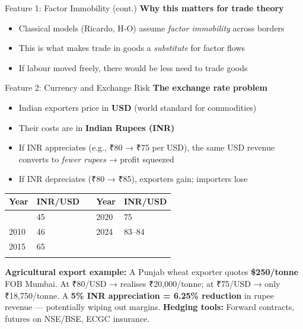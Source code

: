 \documentclass[
  ignorenonframetext,
  aspectratio=169,
]{beamer}
\makeatletter
\providecommand{\tightlist}{%
  \setlength{\itemsep}{0pt}\setlength{\parskip}{0pt}}
\let\quarto@originallabel\label
\DeclareRobustCommand*{\label}[1]{\quarto@originallabel{#1}}
\makeatother
\begin{document}
\begin{frame}{Feature 1: Factor Immobility (cont.)}
\label{feature-1-factor-immobility-cont.}
\textbf{Why this matters for trade theory}

\begin{itemize}
\tightlist
\item
  Classical models (Ricardo, H-O) assume \emph{factor immobility} across
  borders
\item
  This is what makes trade in goods a \emph{substitute} for factor flows
\item
  If labour moved freely, there would be less need to trade goods
\end{itemize}
\end{frame}

\begin{frame}{Feature 2: Currency and Exchange Risk}
\label{feature-2-currency-and-exchange-risk}
\textbf{The exchange rate problem}

\begin{itemize}
\tightlist
\item
  Indian exporters price in \textbf{USD} (world standard for
  commodities)
\item
  Their costs are in \textbf{Indian Rupees (INR)}
\item
  If INR appreciates (e.g., ₹80 → ₹75 per USD), the same USD revenue
  converts to \emph{fewer rupees} → profit squeezed
\item
  If INR depreciates (₹80 → ₹85), exporters gain; importers lose
\end{itemize}

\begin{longtable}[]{@{}lllll@{}}
\toprule\noalign{}
Year & INR/USD & & Year & INR/USD \\
\midrule\noalign{}
\endhead
2000 & 45 & & 2020 & 75 \\
2010 & 46 & & 2024 & 83--84 \\
2015 & 65 & & & \\
\bottomrule\noalign{}
\end{longtable}

\textbf{Agricultural export example:} A Punjab wheat exporter quotes
\textbf{\$250/tonne} FOB Mumbai. At ₹80/USD → realises ₹20,000/tonne; at
₹75/USD → only ₹18,750/tonne. A \textbf{5\% INR appreciation = 6.25\%
reduction} in rupee revenue --- potentially wiping out margins.
\textbf{Hedging tools:} Forward contracts, futures on NSE/BSE, ECGC
insurance.
\end{frame}
\end{document}
